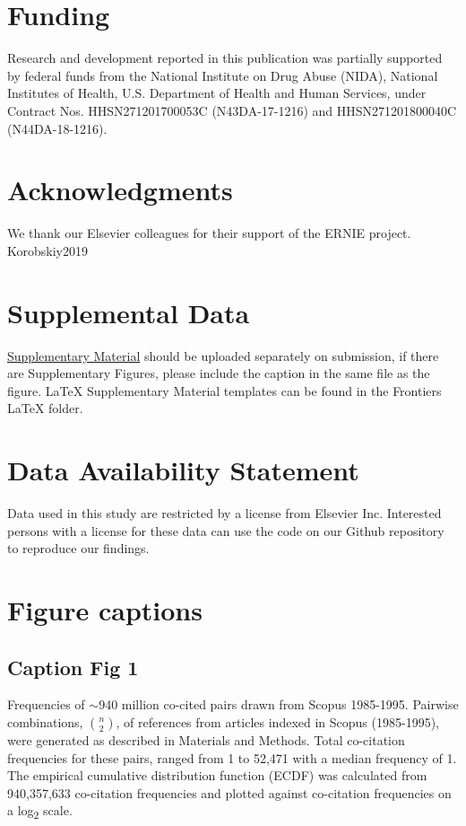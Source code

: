 \documentclass[utf8]{frontiersSCNS}
\begin{document}
\section*{Funding} Research and development reported in this publication was partially supported by federal funds from the National Institute on Drug Abuse (NIDA), National Institutes of Health, U.S. Department of Health and Human Services, under Contract Nos. HHSN271201700053C (N43DA-17-1216) and HHSN271201800040C (N44DA-18-1216).

\section*{Acknowledgments}
We thank our Elsevier colleagues for their support of the ERNIE project. Korobskiy2019

\section*{Supplemental Data}
 \href{http://home.frontiersin.org/about/author-guidelines#SupplementaryMaterial}{Supplementary Material} should be uploaded separately on submission, if there are Supplementary Figures, please include the caption in the same file as the figure. LaTeX Supplementary Material templates can be found in the Frontiers LaTeX folder.

\section*{Data Availability Statement}
Data used in this study are restricted by a license from Elsevier Inc. Interested persons with a license for these data can use the code on our Github repository~\citep{Korobskiy2019} to reproduce our findings. 

 


\section*{Figure captions}

\subsection{Caption Fig 1} Frequencies of $\sim$940 million co-cited pairs drawn from Scopus 1985-1995. Pairwise combinations, $n\choose 2$, of references from articles indexed in Scopus (1985-1995), were generated as described in Materials and Methods. Total co-citation frequencies for these pairs, ranged from 1 to 52,471 with a median frequency of 1. The empirical cumulative distribution function (ECDF) was calculated from 940,357,633 co-citation frequencies and plotted against co-citation frequencies on a log\textsubscript{2} scale.\\
\end{document}
